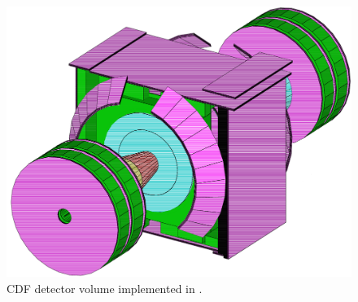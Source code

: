 \begin{figure}[htb!]
 \centering
 \includegraphics[scale=0.4,keepaspectratio=true]{./CDFinGEANT.png}
 \caption{CDF detector volume implemented in \geantText.}
 \label{fig:CDFinGEANT}
\end{figure}


